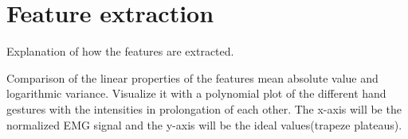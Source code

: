 \section{Feature extraction}
Explanation of how the features are extracted.

Comparison of the linear properties of the features mean absolute value and logarithmic variance.
Visualize it with a polynomial plot of the different hand gestures with the intensities in prolongation of each other. The x-axis will be the normalized EMG signal and the y-axis will be the ideal values(trapeze plateaus).